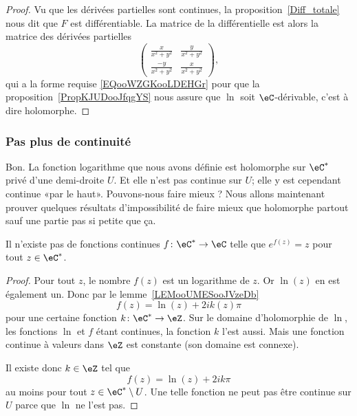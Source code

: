 \begin{proof}
    Vu que les dérivées partielles sont continues, la proposition~\ref{Diff_totale} nous dit que \( F\) est différentiable. La matrice de la différentielle est alors la matrice des dérivées partielles
    \begin{equation}
        \begin{pmatrix}
            \frac{ x }{ x^2+y^2 }    &   \frac{ y }{ x^2+y^2 }    \\
            \frac{ -y }{ x^2+y^2 }    &   \frac{ x }{ x^2+y^2 }
        \end{pmatrix},
    \end{equation}
    qui a la forme requise \eqref{EQooWZGKooLDEHGr} pour que la proposition~\ref{PropKJUDooJfqgYS} nous assure que \( \ln\) soit \( \eC\)-dérivable, c'est à dire holomorphe.
\end{proof}

\subsubsection{Pas plus de continuité}

Bon. La fonction logarithme que nous avons définie est holomorphe sur \( \eC^*\) privé d'une demi-droite \( U\). Et elle n'est pas continue sur \( U\); elle y est cependant continue «par le haut». Pouvons-nous faire mieux ? Nous allons maintenant prouver quelques résultats d'impossibilité de faire mieux que holomorphe partout sauf une partie pas si petite que ça.

\begin{proposition}
    Il n'existe pas de fonctions continues \( f\colon \eC^*\to \eC\) telle que \(  e^{f(z)}=z\) pour tout \( z\in \eC^*\).
\end{proposition}

\begin{proof}
    Pour tout \( z\), le nombre \( f(z)\) est un logarithme de \( z\). Or \( \ln(z)\) en est également un. Donc par le lemme~\ref{LEMooUMESooJVzeDb}
    \begin{equation}
        f(z)=\ln(z)+2i k(z)\pi
    \end{equation}
    pour une certaine fonction \( k\colon \eC^*\to \eZ\). Sur le domaine d'holomorphie de \( \ln\), les fonctions \( \ln\) et \( f\) étant continues, la fonction \( k\) l'est aussi. Mais une fonction continue à valeurs dans \( \eZ\) est constante (son domaine est connexe).

    Il existe donc \( k\in \eZ\) tel que
    \begin{equation}
         f(z)=\ln(z)+2ik\pi
    \end{equation}
    au moins pour tout \( z\in \eC^*\setminus U\). Une telle fonction ne peut pas être continue sur \( U\) parce que \( \ln\) ne l'est pas.
\end{proof}

